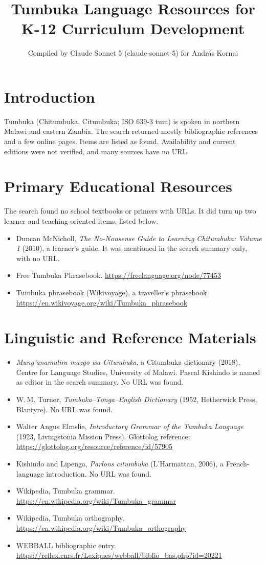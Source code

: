 \documentclass[12pt]{article}
\title{Tumbuka Language Resources for K-12 Curriculum Development}
\author{Compiled by Claude Sonnet 5 (claude-sonnet-5) for Andr\'as Kornai}
\date{}
\begin{document}
\maketitle

\section{Introduction}
Tumbuka (Chitumbuka, Citumbuka; ISO 639-3 tum) is spoken in northern Malawi and eastern Zambia. The search returned mostly bibliographic references and a few online pages. Items are listed as found. Availability and current editions were not verified, and many sources have no URL.

\section{Primary Educational Resources}
The search found no school textbooks or primers with URLs. It did turn up two learner and teaching-oriented items, listed below.
\begin{itemize}
\item Duncan McNicholl, \emph{The No-Nonsense Guide to Learning Chitumbuka: Volume 1} (2010), a learner's guide. It was mentioned in the search summary only, with no URL.
\item Free Tumbuka Phrasebook. \url{https://freelanguage.org/node/77453}
\item Tumbuka phrasebook (Wikivoyage), a traveller's phrasebook. \url{https://en.wikivoyage.org/wiki/Tumbuka_phrasebook}
\end{itemize}

\section{Linguistic and Reference Materials}
\begin{itemize}
\item \emph{Mung'anamulira mazgo wa Citumbuka}, a Citumbuka dictionary (2018), Centre for Language Studies, University of Malawi. Pascal Kishindo is named as editor in the search summary. No URL was found.
\item W.\,M. Turner, \emph{Tumbuka--Tonga--English Dictionary} (1952, Hetherwick Press, Blantyre). No URL was found.
\item Walter Angus Elmslie, \emph{Introductory Grammar of the Tumbuka Language} (1923, Livingstonia Mission Press). Glottolog reference: \url{https://glottolog.org/resource/reference/id/57905}
\item Kishindo and Lipenga, \emph{Parlons citumbuka} (L'Harmattan, 2006), a French-language introduction. No URL was found.
\item Wikipedia, Tumbuka grammar. \url{https://en.wikipedia.org/wiki/Tumbuka_grammar}
\item Wikipedia, Tumbuka orthography. \url{https://en.wikipedia.org/wiki/Tumbuka_orthography}
\item WEBBALL bibliographic entry. \url{https://reflex.cnrs.fr/Lexiques/webball/biblio_bas.php?id=20221}
\end{itemize}
\end{document}
